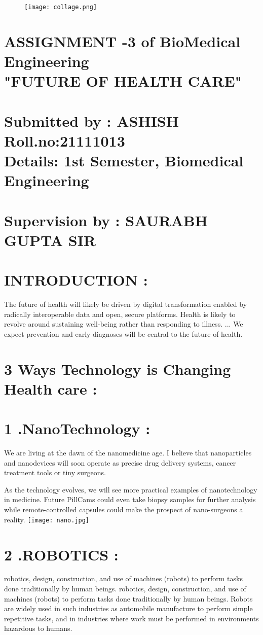 \documentclass[12pt]{article}
\begin{document}
\begin{figure}
\centering
\texttt{[image: collage.png]}

\end{figure}

\section*{ASSIGNMENT -3 of BioMedical Engineering\\"FUTURE OF HEALTH CARE"\\\\Submitted by : ASHISH\\Roll.no:21111013\\Details: 1st Semester, Biomedical Engineering\\\\Supervision by : SAURABH GUPTA SIR }

\clearpage
\section*{INTRODUCTION :}
The future of health will likely be driven by digital transformation enabled by radically interoperable data and open, secure platforms. Health is likely to revolve around sustaining well-being rather than responding to illness. ... We expect prevention and early diagnoses will be central to the future of health.

\section*{3 Ways Technology is Changing Health care :}
\section*{1 .NanoTechnology :}
We are living at the dawn of the nanomedicine age. I believe that nanoparticles and nanodevices will soon operate as precise drug delivery systems, cancer treatment tools or tiny surgeons.

As the technology evolves, we will see more practical examples of nanotechnology in medicine. Future PillCams could even take biopsy samples for further analysis while remote-controlled capsules could make the prospect of nano-surgeons a reality.
\centering
\texttt{[image: nano.jpg]}
\section*{2 .ROBOTICS :}
robotics, design, construction, and use of machines (robots) to perform tasks done traditionally by human beings.  
robotics, design, construction, and use of machines (robots) to perform tasks done traditionally by human beings.  Robots are widely used in such industries as automobile manufacture to perform simple repetitive tasks, and in industries where work must be performed in environments hazardous to humans.
\end{document}

